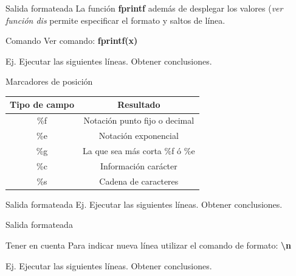 \documentclass{bredelebeamer}
\begin{document}
\begin{frame}{Salida formateada}
La función \textbf{fprintf} además de desplegar los valores (\textit{ver función dis} permite especificar el formato y saltos de línea.
\begin{exampleblock}{Comando}
Ver comando: \textbf{fprintf(x)}
\end{exampleblock}
Ej. Ejecutar las siguientes líneas. Obtener conclusiones.
\end{frame}

\begin{frame}{Marcadores de posición}
\begin{table}[]
\centering
\begin{tabular}{|c|c|}
\hline
Tipo de campo & Resultado                      \\ \hline
\%f           & Notación punto fijo o decimal  \\ \hline
\%e           & Notación exponencial           \\ \hline
\%g           & La que sea más corta \%f ó \%e \\ \hline
\%c           & Información carácter           \\ \hline
\%s           & Cadena de caracteres           \\ \hline
\end{tabular}
\end{table}
\end{frame}

\begin{frame}{Salida formateada}
Ej. Ejecutar las siguientes líneas. Obtener conclusiones.
\end{frame}

\begin{frame}{Salida formateada}
\begin{block}{Tener en cuenta}
Para indicar nueva línea utilizar el comando de formato: \textbf{\textbackslash n}
\end{block}
Ej. Ejecutar las siguientes líneas. Obtener conclusiones.
\end{frame}
\end{document}
